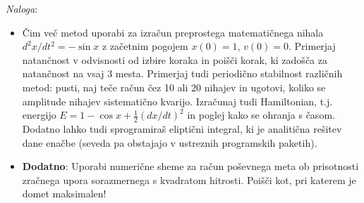 \documentclass[12pt]{article}
\begin{document}
\medskip

{\it Naloga\/}:
\begin{itemize}
	\item Čim več metod uporabi za izračun preprostega matematičnega nihala $d^2 x/dt^2 = - \sin x$
z začetnim pogojem $x(0)=1$, $v(0)=0$. Primerjaj natančnost v odvisnosti od izbire koraka in poišči korak,
ki zadošča za natančnost na vsaj 3 mesta. Primerjaj tudi periodično stabilnost različnih metod: pusti,
naj teče račun čez 10 ali 20 nihajev in ugotovi, koliko se amplitude nihajev sistematično kvarijo. Izračunaj tudi
Hamiltonian, t.j. energijo $E = 1-\cos x + \frac{1}{2} (dx/dt)^2$ in poglej kako se ohranja s časom.
Dodatno lahko tudi sprogramiraš eliptični integral, ki je analitična rešitev
dane enačbe (seveda pa obstajajo v ustreznih programskih paketih).
	\item \textbf{Dodatno}: Uporabi numerične sheme za račun poševnega meta ob prisotnosti zračnega upora sorazmernega s kvadratom hitrosti. Poišči kot, pri katerem je domet maksimalen!
\end{itemize}


\clearpage
\end{document}
